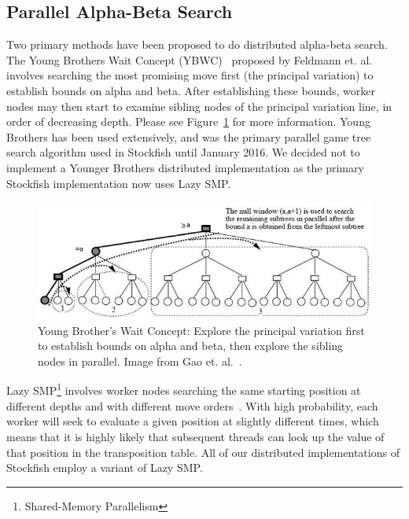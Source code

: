 \documentclass{article}
\begin{document}
\subsection{Parallel Alpha-Beta Search}
Two primary methods have been proposed to do distributed alpha-beta search. The
Young Brothers Wait Concept (YBWC)~\cite{YBWC:article} proposed by Feldmann et.
al. involves searching the most
promising move first (the principal variation) to establish bounds on alpha and
beta. After establishing these bounds, worker nodes may then start to examine sibling
nodes of the principal variation line, in order of decreasing depth.
Please see Figure~\ref{fig:YBWC} for more information. Young Brothers has been used
extensively, and was the primary parallel game tree search algorithm used in
Stockfish until January 2016. We decided not to implement a Younger Brothers
distributed implementation as the primary Stockfish implementation now uses Lazy
SMP.

\begin{figure}[t]\label{fig:YBWC}
	\includegraphics[width=\textwidth]{PVSplit}
	\caption{Young Brother's Wait Concept: Explore the principal variation
	first to establish bounds on alpha and beta, then explore the sibling
	nodes in parallel. Image from Gao et. al.~\cite{PVSplit:article}.}
\end{figure}
Lazy SMP\footnote{Shared-Memory Parallelism} involves worker nodes searching the
same starting position at different depths and with different move
orders~\cite{LazySMP}.
With high probability, each worker will seek to evaluate a given position at
slightly different times, which means that it is highly likely that subsequent
threads can look up the value of that position in the transposition table. All
of our distributed implementations of Stockfish employ a variant of Lazy SMP.
\end{document}
